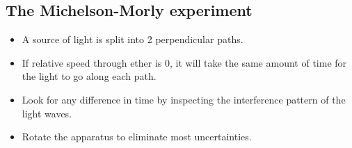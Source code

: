 \documentclass[aspectratio=169,
hyperref={colorlinks,urlcolor=blue}
]{beamer}
\begin{document}
\subsection{The Michelson-Morly experiment}
\label{subsec:themichelsonmorleyexperiment}
{
\begin{itemize}
\item A source of light is split into 2 perpendicular paths.
\item If relative speed through ether is 0, it will take the same amount of time for the light to go along each path.
\item Look for any difference in time by inspecting the interference pattern of the light waves.
\item Rotate the apparatus to eliminate most uncertainties.
\end{itemize}
}
\end{document}
